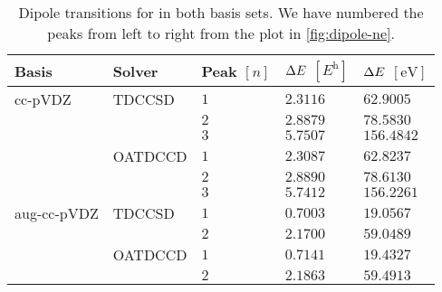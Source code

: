         \begin{table}
            \centering
            \caption{Dipole transitions for  in both basis sets.
            We have numbered the peaks from left to right from the plot in
            \autoref{fig:dipole-ne}.}
            \renewcommand{\arraystretch}{1.3}
            \begin{tabular}{@{}lllll@{}}
                \toprule
                Basis & Solver & Peak $[n]$
                & $\Delta E$ $[\si{\hartree}]$
                & $\Delta E$ $[\si{\electronvolt}]$
                \\
                \midrule
                cc-pVDZ & TDCCSD & $1$ & $2.3116$ & $62.9005$ \\
                & & $2$ & $2.8879$ & $78.5830$ \\
                & & $3$ & $5.7507$ & $156.4842$ \\
                & OATDCCD & $1$ & $2.3087$ & $62.8237$ \\
                & & $2$ & $2.8890$ & $78.6130$ \\
                & & $3$ & $5.7412$ & $156.2261$ \\
                aug-cc-pVDZ & TDCCSD & $1$ & $0.7003$ & $19.0567$ \\
                & & $2$ & $2.1700$ & $59.0489$ \\
                & OATDCCD & $1$ & $0.7141$ & $19.4327$ \\
                & & $2$ & $2.1863$ & $59.4913$ \\
                \bottomrule
            \end{tabular}
            \label{tab:dipole-ne}
        \end{table}

